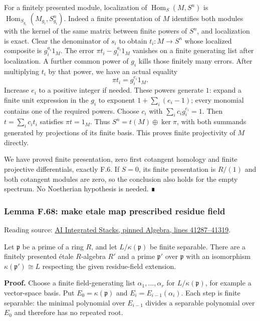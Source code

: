 \documentclass[11pt,a4paper,openany]{report}
\begin{document}
For a finitely presented module, localization of \(\operatorname{Hom}_S(M,S^n)\) is \(\operatorname{Hom}_{S_{g_i}}(M_{g_i},S_{g_i}^n)\). Indeed a finite presentation of \(M\) identifies both modules with the kernel of the same matrix between finite powers of \(S^n\), and localization is exact. Clear the denominator of \(s_i\) to obtain \(t_i:M\to S^n\) whose localized composite is \(g_i^{a_i}1_M\). The error \(\pi t_i-g_i^{a_i}1_M\) vanishes on a finite generating list after localization. A further common power of \(g_i\) kills those finitely many errors. After multiplying \(t_i\) by that power, we have an actual equality \[\pi t_i=g_i^{e_i}1_M.\] Increase \(e_i\) to a positive integer if needed. These powers generate \(1\): expand a finite unit expression in the \(g_i\) to exponent \(1+\sum_i(e_i-1)\); every monomial contains one of the required powers. Choose \(c_i\) with \(\sum_i c_ig_i^{e_i}=1\). Then \(t=\sum_i c_it_i\) satisfies \(\pi t=1_M\). Thus \(S^n=t(M)\oplus\ker\pi\), with both summands generated by projections of its finite basis. This proves finite projectivity of \(M\) directly.

We have proved finite presentation, zero first cotangent homology and finite projective differentials, exactly F.6. If \(S=0\), its finite presentation is \(R/(1)\) and both cotangent modules are zero, so the conclusion also holds for the empty spectrum. No Noetherian hypothesis is needed. ∎

\label{AG-RG-S05-algebra-lemma-make-etale-map-prescribed-residue-field}

\subsubsection{Lemma F.68: make etale map prescribed residue field}\label{AG-RG-S05-lemma-f.68-make-etale-map-prescribed-residue-field}

Reading source: \href{https://github.com/KokunoYumeto/unofficial-stacks-project-ai-drafts/blob/565b10e987aba5969b21145a0833f42d69f96790/algebra.tex\#L41287-L41319}{AI Integrated Stacks, pinned Algebra, lines 41287--41319}.

Let \(\mathfrak p\) be a prime of a ring \(R\), and let \(L/\kappa(\mathfrak p)\) be finite separable. There are a finitely presented étale \(R\)-algebra \(R'\) and a prime \(\mathfrak p'\) over \(\mathfrak p\) with an isomorphism \(\kappa(\mathfrak p')\cong L\) respecting the given residue-field extension.

\textbf{Proof.} Choose a finite field-generating list \(\alpha_1,\ldots,\alpha_r\) for \(L/\kappa(\mathfrak p)\), for example a vector-space basis. Put \(E_0=\kappa(\mathfrak p)\) and \(E_i=E_{i-1}(\alpha_i)\). Each step is finite separable: the minimal polynomial over \(E_{i-1}\) divides a separable polynomial over \(E_0\) and therefore has no repeated root.
\end{document}
